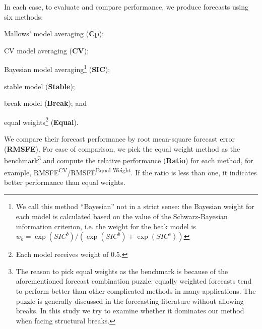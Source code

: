 In each case, to evaluate and compare performance, we produce forecasts using six methods:
\begin{inparaenum}[(i)]
\item Mallows' model averaging (\textbf{Cp});
\item CV model averaging (\textbf{CV});
\item Bayesian model averaging\footnote{We call this method ``Bayesian'' not in a strict sense: the Bayesian weight for each model is calculated based on the value of the Schwarz-Bayesian information criterion, i.e. the weight for the beak model is $w_{b} = \exp{(SIC^{b})}/(\exp{(SIC^{b})} + \exp{(SIC^{s})})$} (\textbf{SIC});
\item stable model (\textbf{Stable});
\item break model (\textbf{Break}); and
\item equal weights\footnote{Each model receives weight of $0.5$.} (\textbf{Equal}).
\end{inparaenum}
We compare their forecast performance by root mean-square forecast error (\textbf{RMSFE}). For ease of comparison, we pick the equal weight method as the benchmark\footnote{The reason to pick equal weights as the benchmark is because of the aforementioned forecast combination puzzle: equally weighted forecasts tend to perform better than other complicated methods in many applications. The puzzle is generally discussed in the forecasting literature without allowing breaks. In this study we try to examine whether it dominates our method when facing structural breaks.} and compute the relative performance (\textbf{Ratio}) for each method, for example, RMSFE\textsuperscript{CV}/RMSFE\textsuperscript{Equal Weight}. If the ratio is less than one, it indicates better performance than equal weights.
